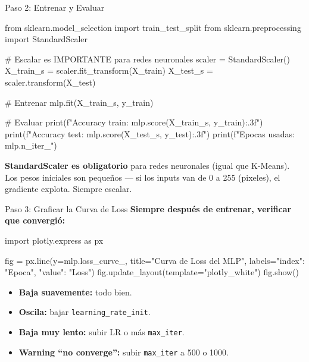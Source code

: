 \documentclass[aspectratio=169, 11pt]{beamer}
\begin{document}
\begin{frame}[fragile,shrink=18]{Paso 2: Entrenar y Evaluar}
  \vspace{-6pt}
  \begin{pyblock}
from sklearn.model_selection import train_test_split
from sklearn.preprocessing import StandardScaler

# Escalar es IMPORTANTE para redes neuronales
scaler = StandardScaler()
X_train_s = scaler.fit_transform(X_train)
X_test_s = scaler.transform(X_test)

# Entrenar
mlp.fit(X_train_s, y_train)

# Evaluar
print(f"Accuracy train: {mlp.score(X_train_s, y_train):.3f}")
print(f"Accuracy test:  {mlp.score(X_test_s, y_test):.3f}")
print(f"Epocas usadas:  {mlp.n_iter_}")
  \end{pyblock}

  \vspace{4pt}
  {\scriptsize\color{arcaDark}
    \faExclamationTriangle\hspace{4pt} \textbf{StandardScaler es obligatorio}
    para redes neuronales (igual que K-Means). Los pesos iniciales son
    peque\~nos --- si los inputs van de 0 a 255 (pixeles), el gradiente
    explota. Siempre escalar.}
\end{frame}

\begin{frame}[fragile,shrink=10]{Paso 3: Graficar la Curva de Loss}
  \vspace{-4pt}
  {\footnotesize\color{arcaDark}\bfseries
    Siempre despu\'es de entrenar, verificar que convergi\'o:}

  \vspace{4pt}
  \begin{pyblock}
import plotly.express as px

fig = px.line(y=mlp.loss_curve_,
    title="Curva de Loss del MLP",
    labels={"index": "Epoca", "value": "Loss"})
fig.update_layout(template="plotly_white")
fig.show()
  \end{pyblock}

  \vspace{4pt}
  {\scriptsize\color{arcaDark}
  \begin{itemize}\setlength{\itemsep}{3pt}
    \item[{\color{codeGreen}\scriptsize\faCheckCircle}]
      \textbf{Baja suavemente:} todo bien.
    \item[{\color{arcaRed}\scriptsize\faTimesCircle}]
      \textbf{Oscila:} bajar \texttt{learning\_rate\_init}.
    \item[{\color{codeBlue}\scriptsize\faArrowRight}]
      \textbf{Baja muy lento:} subir LR o m\'as \texttt{max\_iter}.
    \item[{\color{codeOrange}\scriptsize\faArrowRight}]
      \textbf{Warning ``no converge'':} subir \texttt{max\_iter} a 500 o 1000.
  \end{itemize}
  }
\end{frame}
\end{document}
